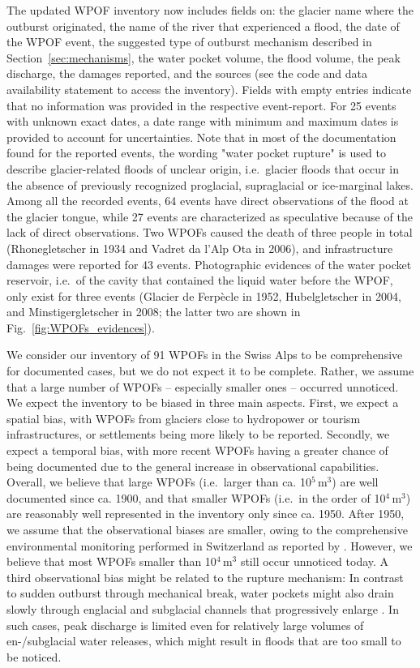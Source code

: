 The updated WPOF inventory now includes fields on: the glacier name where the outburst originated, the name of the river that experienced a flood, the date of the WPOF event, the suggested type of outburst mechanism described in Section~\ref{sec:mechanisms}, the water pocket volume, the flood volume, the peak discharge, the damages reported, and the sources (see the code and data availability statement to access the inventory). Fields with empty entries indicate that no information was provided in the respective event-report. For 25 events with unknown exact dates, a date range with minimum and maximum dates is provided to account for uncertainties. Note that in most of the documentation found for the reported events, the wording "water pocket rupture" is used to describe glacier-related floods of unclear origin, i.e.\ glacier floods that occur in the absence of previously recognized proglacial, supraglacial or ice-marginal lakes. Among all the recorded events, 64 events have direct observations of the flood at the glacier tongue, while 27 events are characterized as speculative because of the lack of direct observations. Two WPOFs caused the death of three people in total (Rhonegletscher in 1934 and Vadret da l'Alp Ota in 2006), and infrastructure damages were reported for 43 events. Photographic evidences of the water pocket reservoir, i.e.\ of the cavity that contained the liquid water before the WPOF, only exist for three events (Glacier de Ferpècle in 1952, Hubelgletscher in 2004, and Minstigergletscher in 2008; the latter two are shown in Fig.~\ref{fig:WPOFs_evidences}).

We consider our inventory of 91 WPOFs in the Swiss Alps to be comprehensive for documented cases, but we do not expect it to be complete. Rather, we assume that a large number of WPOFs -- especially smaller ones -- occurred unnoticed. We expect the inventory to be biased in three main aspects. First, we expect a spatial bias, with WPOFs from glaciers close to hydropower or tourism infrastructures, or settlements being more likely to be reported. Secondly, we expect a temporal bias, with more recent WPOFs having a greater chance of being documented due to the general increase in observational capabilities. Overall, we believe that large WPOFs (i.e.\ larger than ca. 10$^5$\,m$^3$) are well documented since ca. 1900, and that smaller WPOFs (i.e.\ in the order of 10$^4$\,m$^3$) are reasonably well represented in the inventory only since ca. 1950. After 1950, we assume that the observational biases are smaller, owing to the comprehensive environmental monitoring performed in Switzerland as reported by \cite{Zemp_WGMS2020}. However, we believe that most WPOFs smaller than 10$^4$\,m$^3$ still occur unnoticed today. A third observational bias might be related to the rupture mechanism: In contrast to sudden outburst through mechanical break, water pockets might also drain slowly through englacial and subglacial channels that progressively enlarge \citep{Nye1976}. In such cases, peak discharge is limited even for relatively large volumes of en-/subglacial water releases, which might result in floods that are too small to be noticed. 

